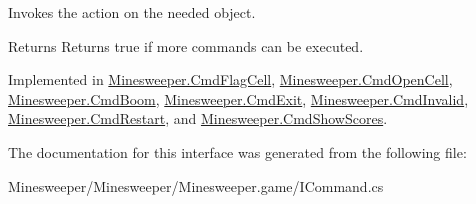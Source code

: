 Invokes the action on the needed object. 

\begin{DoxyReturn}{Returns}
Returns true if more commands can be executed.
\end{DoxyReturn}


Implemented in \hyperlink{class_minesweeper_1_1_cmd_flag_cell_ab8fdee19beed086308829c7d3ae9b7ef}{Minesweeper.\+Cmd\+Flag\+Cell}, \hyperlink{class_minesweeper_1_1_cmd_open_cell_ad8627666ebddf09daf909b3c66173954}{Minesweeper.\+Cmd\+Open\+Cell}, \hyperlink{class_minesweeper_1_1_cmd_boom_ac98aceae68a835b332342321a1a53abe}{Minesweeper.\+Cmd\+Boom}, \hyperlink{class_minesweeper_1_1_cmd_exit_a218e1498a94ac5b49f0dab48d4f154aa}{Minesweeper.\+Cmd\+Exit}, \hyperlink{class_minesweeper_1_1_cmd_invalid_a7d6834d857c3159a20160c2eb94c557e}{Minesweeper.\+Cmd\+Invalid}, \hyperlink{class_minesweeper_1_1_cmd_restart_a58ff1eea35e4a710c840eedcd421122f}{Minesweeper.\+Cmd\+Restart}, and \hyperlink{class_minesweeper_1_1_cmd_show_scores_ab704f1d09e8802999384c6af9d8d807b}{Minesweeper.\+Cmd\+Show\+Scores}.



The documentation for this interface was generated from the following file\+:\begin{DoxyCompactItemize}
\item 
Minesweeper/\+Minesweeper/\+Minesweeper.\+game/I\+Command.\+cs\end{DoxyCompactItemize}
